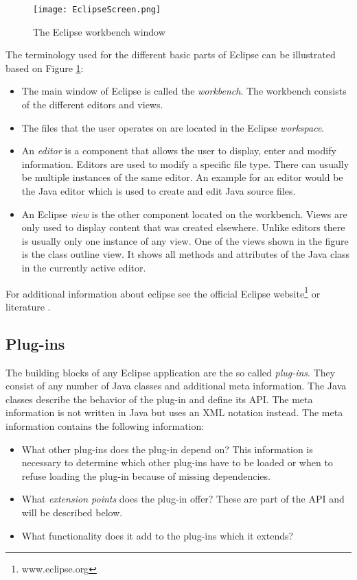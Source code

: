 \begin{figure}
  \centering
  \texttt{[image: EclipseScreen.png]}
  \caption[The Eclipse workbench window]%
  {The Eclipse workbench window\protect}
  \label{fig:EclipseScreen}
\end{figure}
The terminology used for the different basic parts of Eclipse can be illustrated based on Figure
\ref{fig:EclipseScreen}:
\begin{itemize}
 \item The main window of Eclipse is called the \textit{workbench}. The workbench consists of the 
different editors and views.
 \item The files that the user operates on are located in the Eclipse \textit{workspace}. 
 \item An \textit{editor} is a component that allows the user to display, enter and modify information.
Editors are used to modify a specific file type. There can usually be multiple instances of the same editor.
An example for an editor would be the Java editor which is used to create and edit Java source files.
 \item An Eclipse \textit{view} is the other component located on the workbench. Views are only used to
display content that was created elsewhere. Unlike editors there is usually only one instance of any view.
One of the views shown in the figure is the class outline view. It shows all methods and attributes of the 
Java class in the currently active editor.
\end{itemize}

For additional information about eclipse see the official Eclipse website\footnote{www.eclipse.org} or literature \cite{eclipsePlugins}.

\subsection{Plug-ins}
\label{section:ConfTechPlugins}
The building blocks of any Eclipse application are the so called \textit{plug-ins}. They
consist of any number of Java classes and additional meta information. The Java classes
describe the behavior of the plug-in and define its \ac{API}. The meta information is not written
in Java but uses an \ac{XML} notation instead. The meta information contains the following
information:
\begin{itemize}
 \item What other plug-ins does the plug-in depend on? This information is necessary to determine
which other plug-ins have to be loaded or when to refuse loading the plug-in because of missing
dependencies.
 \item What \textit{extension points} does the plug-in offer? These are part of the \ac{API} and
will be described below.
 \item What functionality does it add to the plug-ins which it extends?
\end{itemize}

